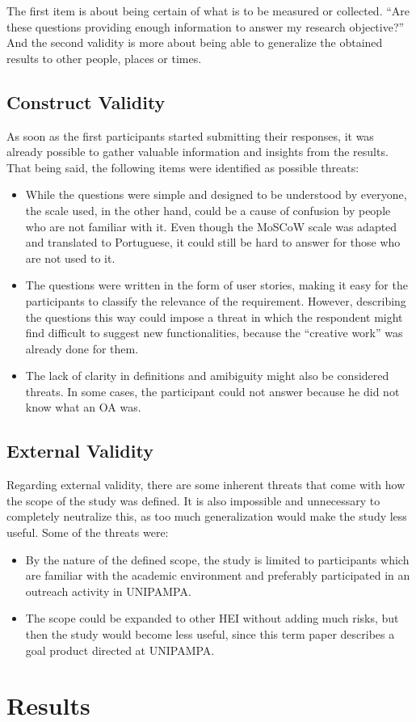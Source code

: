 The first item is about being certain of what is to be measured or collected. ``Are these questions providing enough information to answer my research objective?'' And the second validity is more about being able to generalize the obtained results to other people, places or times.

\subsection{Construct Validity}\label{sec:survey-construct-validity}

As soon as the first participants started submitting their responses, it was already possible to gather valuable information and insights from the results. That being said, the following items were identified as possible threats:
\begin{itemize}
  \item While the questions were simple and designed to be understood by everyone, the scale used, in the other hand, could be a cause of confusion by people who are not familiar with it. Even though the MoSCoW scale was adapted and translated to Portuguese, it could still be hard to answer for those who are not used to it.
  \item The questions were written in the form of user stories, making it easy for the participants to classify the relevance of the requirement. However, describing the questions this way could impose a threat in which the respondent might find difficult to suggest new functionalities, because the ``creative work'' was already done for them.
  \item The lack of clarity in definitions and amibiguity might also be considered threats. In some cases, the participant could not answer because he did not know what an \ac{OA} was.
\end{itemize}

\subsection{External Validity}\label{sec:survey-external-validity}

Regarding external validity, there are some inherent threats that come with how the scope of the study was defined. It is also impossible and unnecessary to completely neutralize this, as too much generalization would make the study less useful. Some of the threats were:
\begin{itemize}
  \item By the nature of the defined scope, the study is limited to participants which are familiar with the academic environment and preferably participated in an outreach activity in \ac{UNIPAMPA}.
  \item The scope could be expanded to other \ac{HEI} without adding much risks, but then the study would become less useful, since this term paper describes a goal product directed at \ac{UNIPAMPA}.
\end{itemize}

\section{Results}\label{sec:survey-results}

